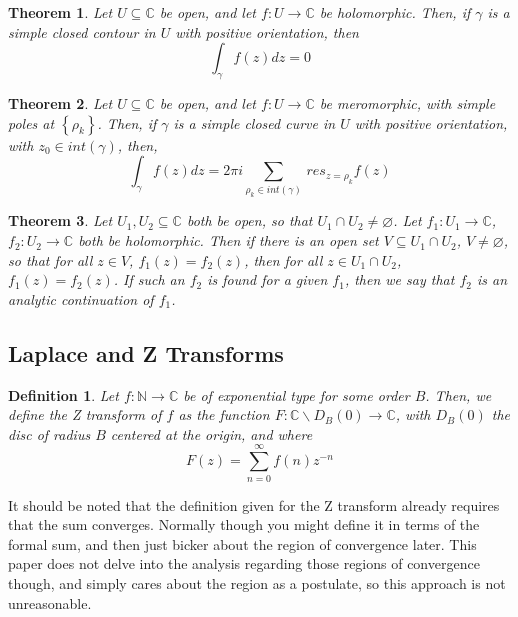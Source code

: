 \documentclass{article}
\newtheorem{definition}{Definition}
\newtheorem{theorem}{Theorem}
\begin{document}
	
	\begin{theorem} \label{ cauchy_theorem }
		Let $ U \subseteq \mathbb{C} $ be open, and let $f : U \rightarrow \mathbb{C}$ be holomorphic. Then, if $\gamma$ is a simple closed contour in $U$ with positive orientation, then
		$$ \int_{\gamma} f(z) dz = 0 $$
	\end{theorem}

	\begin{theorem} \label{ cauchy_residue_theorem }
		Let $ U \subseteq \mathbb{C} $ be open, and let $f : U \rightarrow \mathbb{C}$ be meromorphic, with simple poles at $\left\{ \rho_k \right\}$. Then, if $\gamma$ is a simple closed curve in $U$ with positive orientation, with $z_0 \in int(\gamma)$, then, 
		$$ \int_{\gamma} f(z) dz = 2 \pi i \sum_{ \rho_k \in int(\gamma) } \, res_{z=\rho_k} f(z) $$
	\end{theorem}

	\begin{theorem} \label{ analytic_continuation }
		Let $U_1, U_2 \subseteq \mathbb{C}$ both be open, so that $U_1 \cap U_2 \neq \varnothing$. Let $f_1 : U_1 \rightarrow \mathbb{C}$, $f_2 : U_2 \rightarrow \mathbb{C}$ both be holomorphic. Then if there is an open set $ V \subseteq U_1 \cap U_2 $, $V \neq \varnothing$, so that for all $z \in V$, $f_1(z) = f_2(z)$, then for all $z \in U_1 \cap U_2$, $f_1(z) = f_2(z)$. If such an $f_2$ is found for a given $f_1$, then we say that $f_2$ is an analytic continuation of $f_1$.
	\end{theorem}

	

	\subsection{Laplace and Z Transforms}

	\begin{definition} \label{ def_Z_Transform }
		Let $ f : \mathbb{N} \rightarrow \mathbb{C} $ be of exponential type for some order $B$. Then, we define the Z transform of $f$ as the function $F : \mathbb{C} \backslash D_{B}(0) \rightarrow \mathbb{C}$, with $D_{B}(0)$ the disc of radius $B$ centered at the origin, and where
		$$ F \left( z \right) = \sum_{n = 0}^{\infty} f \left( n \right) z^{-n} $$
	\end{definition}

	It should be noted that the definition given for the Z transform already requires that the sum converges. Normally though you might define it in terms of the formal sum, and then just bicker about the region of convergence later. This paper does not delve into the analysis regarding those regions of convergence though, and simply cares about the region as a postulate, so this approach is not unreasonable. 
	
\end{document}
